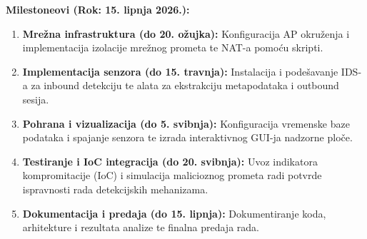 \documentclass[12pt, a4paper]{article}
\begin{document}
\vspace{1em}
\noindent\textbf{Milestoneovi (Rok: 15. lipnja 2026.):}
\begin{enumerate}[label=\textbf{M\arabic*:}, leftmargin=*]
    \item \textbf{Mrežna infrastruktura (do 20. ožujka):} Konfiguracija AP okruženja i implementacija izolacije mrežnog prometa te NAT-a pomoću skripti.
    \item \textbf{Implementacija senzora (do 15. travnja):} Instalacija i podešavanje IDS-a za inbound detekciju te alata za ekstrakciju metapodataka i outbound sesija.
    \item \textbf{Pohrana i vizualizacija (do 5. svibnja):} Konfiguracija vremenske baze podataka i spajanje senzora te izrada interaktivnog GUI-ja nadzorne ploče.
    \item \textbf{Testiranje i IoC integracija (do 20. svibnja):} Uvoz indikatora kompromitacije (IoC) i simulacija malicioznog prometa radi potvrde ispravnosti rada detekcijskih mehanizama.
    \item \textbf{Dokumentacija i predaja (do 15. lipnja):} Dokumentiranje koda, arhitekture i rezultata analize te finalna predaja rada.
\end{enumerate}
\end{document}
